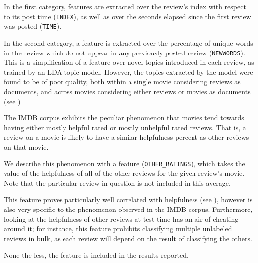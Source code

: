 \documentclass[letter,10pt]{article}
\begin{document}
In the first category, features are extracted over the review's index
	with respect to its post time ({\tt INDEX}), as well as over the
	seconds elapsed since the first review was posted ({\tt TIME}).

In the second category, a feature is extracted over the percentage of unique
	words in the review which do not appear in any previously posted review
	({\tt NEWWORDS}).
This is a simplification of a feature over novel topics introduced in each
	review, as trained by an LDA topic model.
However, the topics extracted by the model were found to be of poor quality,
	both within a single movie considering reviews as documents,
	and across movies considering either reviews or movies as documents
	(see )

The IMDB corpus exhibits the peculiar phenomenon that movies tend towards
	having either mostly helpful rated or mostly unhelpful rated reviews.
That is, a review on a movie is likely to have a similar helpfulness
	percent as other reviews on that movie.

We describe this phenomenon with a feature ({\tt OTHER\_RATINGS}), which
	takes the value of the helpfulness of all of the other reviews
	for the given review's movie.
Note that the particular review in question is not included in this average.

This feature proves particularly well correlated with helpfulness
	(see ), however
	is also very specific to the phenomenon observed in the IMDB corpus.
Furthermore, looking at the helpfulness of other reviews at test time
	has an air of cheating around it; for instance, this feature
	prohibits classifying multiple unlabeled reviews in bulk, as each
	review will depend on the result of classifying the others.

None the less, the feature is included in the results reported.


\end{document}
